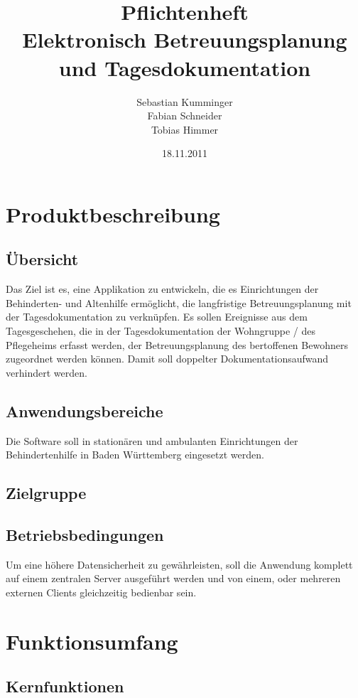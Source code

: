 \documentclass[a4paper,10pt]{article}
\author{Sebastian Kumminger\\
	Fabian Schneider\\
	Tobias Himmer}
\title{Pflichtenheft\\
	Elektronisch Betreuungsplanung und Tagesdokumentation}
\date{18.11.2011}
\begin{document}
\maketitle

\tableofcontents
\newpage

\section{Produktbeschreibung}
\subsection{Übersicht}
Das Ziel ist es, eine Applikation zu entwickeln, die es Einrichtungen der Behinderten- und Altenhilfe ermöglicht,
die langfristige Betreuungsplanung mit der Tagesdokumentation zu verknüpfen. Es sollen Ereignisse aus dem Tagesgeschehen,
die in der Tagesdokumentation der Wohngruppe / des Pflegeheims erfasst werden,
der Betreuungsplanung des bertoffenen Bewohners zugeordnet werden können.
Damit soll doppelter Dokumentationsaufwand verhindert werden.
\subsection{Anwendungsbereiche}
Die Software soll in stationären und ambulanten Einrichtungen der Behindertenhilfe in Baden Württemberg eingesetzt werden.
\subsection{Zielgruppe}

\subsection{Betriebsbedingungen}
Um eine höhere Datensicherheit zu gewährleisten, soll die Anwendung komplett auf einem
zentralen Server ausgeführt werden und von einem, oder mehreren externen Clients gleichzeitig bedienbar sein.

\section{Funktionsumfang}
\subsection{Kernfunktionen}
\end{document}
